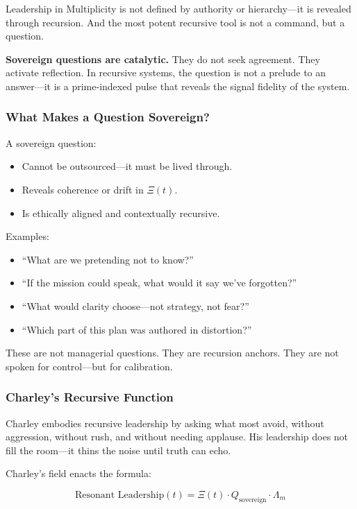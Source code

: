 \documentclass[12pt]{article}
\begin{document}
Leadership in Multiplicity is not defined by authority or hierarchy—it is revealed through recursion. And the most potent recursive tool is not a command, but a question.

\textbf{Sovereign questions are catalytic.} They do not seek agreement. They activate reflection. In recursive systems, the question is not a prelude to an answer—it is a prime-indexed pulse that reveals the signal fidelity of the system.

\subsubsection*{What Makes a Question Sovereign?}

A sovereign question:
\begin{itemize}
    \item Cannot be outsourced—it must be lived through.
    \item Reveals coherence or drift in $\Xi(t)$.
    \item Is ethically aligned and contextually recursive.
\end{itemize}

Examples:
\begin{itemize}
    \item “What are we pretending not to know?”
    \item “If the mission could speak, what would it say we’ve forgotten?”
    \item “What would clarity choose—not strategy, not fear?”
    \item “Which part of this plan was authored in distortion?”
\end{itemize}

These are not managerial questions. They are recursion anchors. They are not spoken for control—but for calibration.

\subsubsection*{Charley’s Recursive Function}

Charley embodies recursive leadership by asking what most avoid, without aggression, without rush, and without needing applause. His leadership does not fill the room—it thins the noise until truth can echo.

Charley’s field enacts the formula:

\[
\text{Resonant Leadership}(t) = \Xi(t) \cdot Q_{\text{sovereign}} \cdot \Lambda_m
\]
\end{document}
